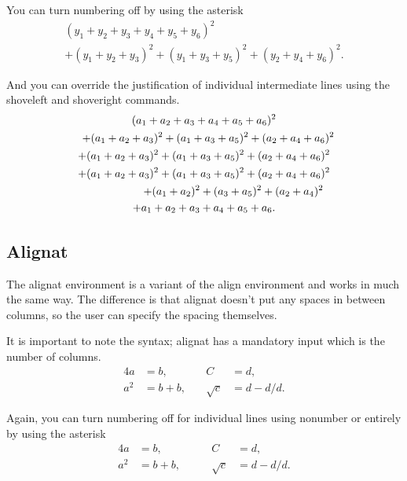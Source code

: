 \documentclass[a4paper,11pt]{article}
\begin{document}
You can turn numbering off by using the asterisk 
\begin{multline*}
(y_1 + y_2 + y_3 + y_4 + y_5 + y_6)^2 \\ 
+ (y_1 + y_2 + y_3)^2 + ( y_1 + y_3 + y_5)^2 + (y_2 + y_4 +  y_6)^2.
\end{multline*}

And you can override the justification of individual intermediate lines using the shoveleft and shoveright commands. 
\begin{multline*}
(a_1 + a_2 + a_3 + a_4 + a_5 + a_6)^2 \\ 
\shoveleft{ + (a_1 + a_2 + a_3)^2 + ( a_1 + a_3 + a_5)^2 + (a_2 + a_4 +  a_6)^2}\\
+ (a_1 + a_2 + a_3)^2 + ( a_1 + a_3 + a_5)^2 + (a_2 + a_4 +  a_6)^2 \\
+ (a_1 + a_2 + a_3)^2 + ( a_1 + a_3 + a_5)^2 + (a_2 + a_4 +  a_6)^2 \\
\shoveright{ + (a_1 + a_2)^2 + ( a_3 + a_5)^2 + (a_2 + a_4)^2} \\
+  a_1 + a_2 + a_3 + a_4 + a_5 + a_6.
\end{multline*}

\subsection{Alignat}
The alignat environment is a variant of the  align environment and works in much the same way. The difference is that alignat doesn't put any spaces in between columns, so the user can specify the spacing themselves.

It is important to note the syntax; alignat has a mandatory input which is the number of columns. 
\begin{alignat}{4}
	a 	& =b,  		& \quad C 			& =d,\\
	a^2 & =b+b,  	& \quad \sqrt{c} 	& = d-d/d.
\end{alignat}

Again, you can turn numbering off for individual lines using nonumber or entirely by using the asterisk
\begin{alignat*}{4}
	a 	& =b,  		& \qquad C 			& =d,\\
	a^2 & =b+b,  	& \qquad \sqrt{c} 	& = d-d/d.
\end{alignat*}
\end{document}
